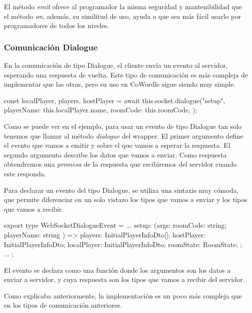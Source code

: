 El método \textit{emit} ofrece al programador la misma seguridad y mantenibilidad que el método \textit{on}, además, su similitud de uso, ayuda a que sea más fácil usarlo por programadores de todos los niveles.

\subsubsection{Comunicación Dialogue}
En la comunicación de tipo Dialogue, el cliente envía un evento al servidor, esperando una respuesta de vuelta. Este tipo de comunicación es más compleja de implementar que las otras, pero su uso en CoWordle sigue siendo muy simple.

\begin{mytypescript}[float={!h},caption={Ejemplo de uso del método \textit{dialogue}.},label={alg:etiqueta}]
	const { localPlayer, players, hostPlayer } = await this.socket.dialogue("setup", {
		playerName: this.localPlayer.name,
		roomCode: this.roomCode,
	});
\end{mytypescript}

Como se puede ver en el ejemplo, para usar un evento de tipo Dialogue tan solo tenemos que llamar al método \textit{dialogue} del wrapper. El primer argumento define el evento que vamos a emitir y sobre el que vamos a esperar la respuesta. El segundo argumento describe los datos que vamos a enviar. Como respuesta obtendremos una \textit{promesa} de la respuesta que recibiremos del servidor cuando este responda.

Para declarar un evento del tipo Dialogue, se utiliza una sintaxis muy cómoda, que permite diferenciar en un solo vistazo los tipos que vamos a enviar y los tipos que vamos a recibir.

\begin{mytypescript}[float={!h},caption={Ejemplo de declaración del tipo de evento Dialogue.},label={alg:etiqueta}]
	export type WebSocketDialogueEvent = {
		...
		setup: (args: { roomCode: string; playerName: string }) => {
			players: InitialPlayerInfoDto[];
			hostPlayer: InitialPlayerInfoDto;
			localPlayer: InitialPlayerInfoDto;
			roomState: RoomState;
		};
		...
	};
\end{mytypescript}

El evento se declara como una función donde los argumentos son los datos a enviar a servidor, y cuya respuesta son los tipos que vamos a recibir del servidor. 

Como explicaba anteriormente, la implementación es un poco más compleja que en los tipos de comunicación anteriores.

